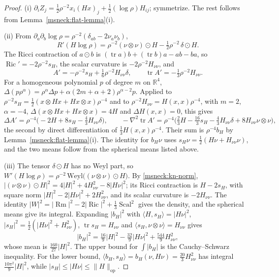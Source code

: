 \documentclass[11pt]{article}
\numberwithin{equation}{section}
\theoremstyle{definition}
\theoremstyle{remark}
\DeclareMathOperator{\Ric}{Ric}
\DeclareMathOperator{\tr}{tr}
\DeclareMathOperator{\Scal}{Scal}
\DeclareMathOperator{\Rm}{Rm}
\begin{document}
\begin{proof}
(i) \(\partial_iZ_j=\tfrac12\rho^{-2}x_i(Hx)_j+\tfrac12(\log\rho)H_{ij}\);
symmetrize. The rest follows from Lemma~\ref{msneck:flat-lemma}(i).

(ii) From \(\partial_a\partial_b\log\rho=\rho^{-2}(\delta_{ab}-2\nu_a\nu_b)\),
\[
 R'(H\log\rho)=\rho^{-2}(\nu\otimes\nu)\odot H-\tfrac12\rho^{-2}\,\delta\odot H .
\]
The Ricci contraction of \(a\odot b\) is \((\tr a)b+(\tr b)a-ab-ba\), so
\(\Ric'=-2\rho^{-2}s_H\), the scalar curvature is
\(-2\rho^{-2}H_{\nu\nu}\), and
\[
 A'=-\rho^{-2}s_H+\tfrac16\rho^{-2}H_{\nu\nu}\delta,\qquad
 \tr A'=-\tfrac13\rho^{-2}H_{\nu\nu}.
\]
For a homogeneous polynomial \(p\) of degree \(m\) on \(\mathbb R^4\),
\(\Delta(p\rho^{\alpha})=\rho^{\alpha}\Delta p+\alpha(2m+\alpha+2)\rho^{\alpha-2}p\).
Applied to \(\rho^{-2}s_H=\tfrac12(x\otimes Hx+Hx\otimes x)\rho^{-4}\) and to
\(\rho^{-2}H_{\nu\nu}=H(x,x)\rho^{-4}\), with \(m=2\), \(\alpha=-4\),
\(\Delta(x\otimes Hx+Hx\otimes x)=4H\) and \(\Delta H(x,x)=0\), this gives
\[
 \Delta A'=\rho^{-4}\bigl(-2H+8s_H-\tfrac43H_{\nu\nu}\delta\bigr),\qquad
 -\nabla^2\tr A'=\rho^{-4}\bigl(\tfrac23H-\tfrac{16}3s_H-\tfrac43H_{\nu\nu}\delta
 +8H_{\nu\nu}\nu\otimes\nu\bigr),
\]
the second by direct differentiation of \(\tfrac13H(x,x)\rho^{-4}\). Their
sum is \(\rho^{-4}b_H\) by Lemma~\ref{msneck:flat-lemma}(i). The identity
for \(b_H\nu\) uses \(s_H\nu=\tfrac12(H\nu+H_{\nu\nu}\nu)\), and the two means
follow from the spherical means listed above.

(iii) The tensor \(\delta\odot H\) has no Weyl part, so
\(W'(H\log\rho)=\rho^{-2}\,\mathrm{Weyl}\bigl((\nu\otimes\nu)\odot H\bigr)\). By
\eqref{msneck:kn-norm},
\(|(\nu\otimes\nu)\odot H|^2=4|H|^2+4H_{\nu\nu}^2-8|H\nu|^2\); its Ricci
contraction is \(H-2s_H\), with square norm
\(|H|^2-2|H\nu|^2+2H_{\nu\nu}^2\), and its scalar curvature is
\(-2H_{\nu\nu}\). The identity
\(|W|^2=|\Rm|^2-2|\Ric|^2+\tfrac13\Scal^2\) gives the density, and the
spherical means give its integral. Expanding \(|b_H|^2\) with
\(\langle H,s_H\rangle=|H\nu|^2\), \(|s_H|^2=\tfrac12(|H\nu|^2+H_{\nu\nu}^2)\),
\(\tr s_H=H_{\nu\nu}\) and \(\langle s_H,\nu\otimes\nu\rangle=H_{\nu\nu}\)
gives
\[
 |b_H|^2=\tfrac{16}9|H|^2-\tfrac{32}9|H\nu|^2+\tfrac{544}9H_{\nu\nu}^2,
\]
whose mean is \(\tfrac{160}{27}|H|^2\). The upper bound for
\(\int|b_H|\) is the Cauchy--Schwarz inequality. For the lower bound,
\(\langle b_H,s_H\rangle=b_H(\nu,H\nu)=\tfrac{20}3H_{\nu\nu}^2\) has integral
\(\tfrac{10\pi^2}9|H|^2\), while
\(|s_H|\le|H\nu|\le\|H\|_{\mathrm{op}}\).


\end{proof}
\end{document}
